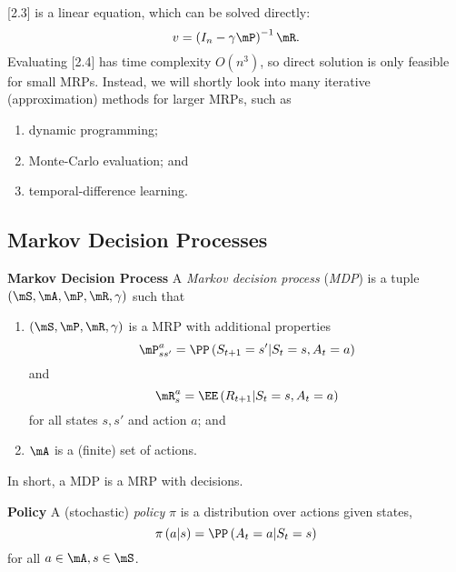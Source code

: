 \documentclass[RL]{subfiles}
\begin{document}
    [2.3] is a linear equation, which can be solved directly:
    \begin{equation}
        v = \left( I_n-\gamma\mP \right)^{-1}\mR.
    \end{equation}
    Evaluating [2.4] has time complexity $O\left( n^{3} \right)$, so direct solution is only feasible for small MRPs. Instead, we will shortly look into many iterative (approximation) methods for larger MRPs, such as
    \begin{enumerate}
        \item dynamic programming;
        \item Monte-Carlo evaluation; and
        \item temporal-difference learning.
    \end{enumerate}
    
    \clearpage
    \subsection{Markov Decision Processes}
    
    \begin{definition}{\textbf{Markov Decision Process}}
        A \emph{Markov decision process} (\emph{MDP}) is a tuple $\left( \mS,\mA,\mP,\mR,\gamma \right)$ such that
        \begin{enumerate}
            \item $\left( \mS,\mP,\mR,\gamma \right)$ is a MRP with additional properties
                \begin{equation*}
                    \mP_{ss'}^a = \PP\left( S_{t+1}=s'|S_t=s, A_t=a \right)
                \end{equation*}
                and
                \begin{equation*}
                    \mR^a_{s} = \EE\left( R_{t+1}|S_t=s, A_t=a \right)
                \end{equation*}
                for all states $s,s'$ and action $a$; and
            \item $\mA$ is a (finite) set of actions.
        \end{enumerate}
    \end{definition}

    In short, a MDP is a MRP with decisions.

    \begin{definition}{\textbf{Policy}}
        A (stochastic) \emph{policy} $\pi$ is a distribution over actions given states,
        \begin{equation*}
            \pi\left( a|s \right) = \PP\left( A_t=a|S_t=s \right)
        \end{equation*}
        for all $a\in\mA,s\in\mS$.
    \end{definition}
\end{document}
